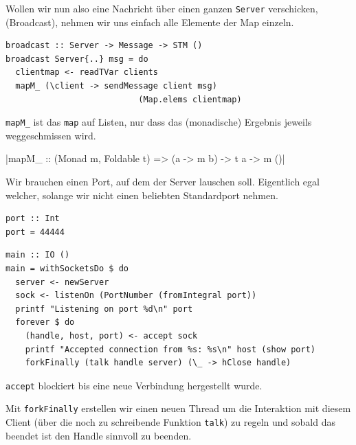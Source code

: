 \documentclass{beamer}
\begin{document}

\begin{frame}[fragile]
Wollen wir nun also eine Nachricht über einen ganzen \texttt{Server} verschicken, 
(Broadcast), nehmen wir uns einfach alle Elemente der Map einzeln.

\begin{verbatim}
broadcast :: Server -> Message -> STM ()
broadcast Server{..} msg = do
  clientmap <- readTVar clients
  mapM_ (\client -> sendMessage client msg)
                           (Map.elems clientmap)
\end{verbatim}
\pause

\texttt{mapM\_} ist das \texttt{map} auf Listen, nur dass das (monadische) Ergebnis jeweils weggeschmissen wird.
\smallskip

|mapM_ :: (Monad m, Foldable t) => (a -> m b) -> t a -> m ()|
\end{frame}


\begin{frame}[fragile]

Wir brauchen einen Port, auf dem der Server lauschen soll. Eigentlich egal welcher, solange wir nicht einen beliebten Standardport nehmen. 

\begin{verbatim}
port :: Int
port = 44444
\end{verbatim}
\end{frame}


\begin{frame}[fragile]

\begin{verbatim}
main :: IO ()
main = withSocketsDo $ do
  server <- newServer
  sock <- listenOn (PortNumber (fromIntegral port))
  printf "Listening on port %d\n" port
  forever $ do
    (handle, host, port) <- accept sock
    printf "Accepted connection from %s: %s\n" host (show port)
    forkFinally (talk handle server) (\_ -> hClose handle)
\end{verbatim}
\pause

\texttt{accept} blockiert bis eine neue Verbindung hergestellt wurde.\pause\smallskip\smallskip

Mit \texttt{forkFinally} erstellen wir einen neuen Thread um die Interaktion mit diesem Client
(über die noch zu schreibende Funktion \texttt{talk}) zu regeln und sobald das beendet ist den Handle
sinnvoll zu beenden.

\end{frame}
\end{document}

